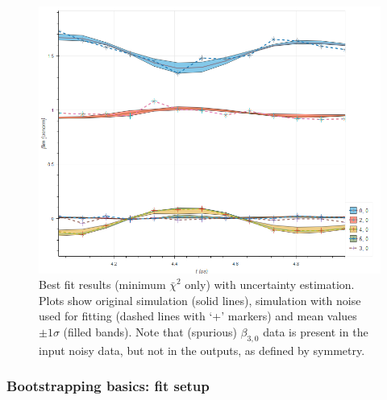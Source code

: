 \documentclass[10pt]{article}
\begin{document}
\begin{figure}[]
\begin{center}
\includegraphics[width=\textwidth,height=\dimexpr\textheight-4\baselineskip-\abovecaptionskip-\belowcaptionskip\relax,keepaspectratio]{figures/dataDump_1000fitTests_multiFit_noise_051021_BLM_allFits_150422.png}
\caption{Best fit results (minimum \(\bar{\chi}^2\) only) with uncertainty estimation. Plots show original simulation (solid lines), simulation with noise used for fitting (dashed lines with `+' markers) and mean values \(\pm1\sigma\) (filled bands). Note that (spurious) \(\beta_{3,0}\) data is present in the input noisy data, but not in the outputs, as defined by symmetry.\label{743962}}
\end{center}
\end{figure}

\subsubsection{Bootstrapping basics: fit setup}
\end{document}
